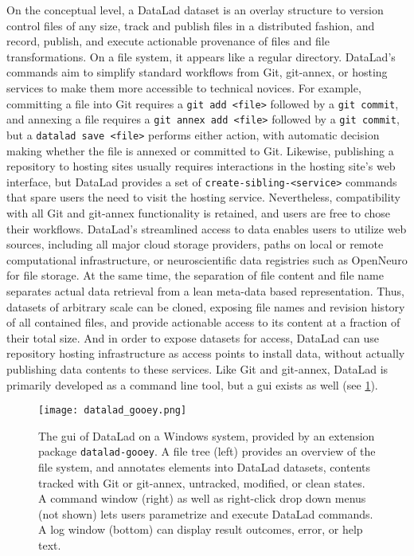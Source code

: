 {On the conceptual level, a DataLad dataset is an overlay structure to version control files of any size, track and publish files in a distributed fashion, and record, publish, and execute actionable provenance of files and file
transformations.
On a file system, it appears like a regular directory.
DataLad's commands aim to simplify standard workflows from Git, git-annex, or hosting services to make them more accessible to technical novices.
For example, committing a file into Git requires a \texttt{git add <file>} followed by a \texttt{git commit}, and annexing a file requires a \texttt{git annex add <file>} followed by a \texttt{git commit}, but a \texttt{datalad save <file>} performs either action, with automatic decision making whether the file is annexed or committed to Git.
Likewise, publishing a repository to hosting sites usually requires interactions in the hosting site's web interface, but DataLad provides a set of \texttt{create-sibling-<service>} commands that spare users the need to visit the hosting service.
Nevertheless, compatibility with all Git and git-annex functionality is retained, and users are free to chose their workflows.
DataLad's streamlined access to data enables users to utilize web sources, including all major cloud storage providers, paths on local or remote computational infrastructure, or neuroscientific data registries such as OpenNeuro \citep{markiewicz2021openneuro} for file storage.
At the same time, the separation of file content and file name separates actual data retrieval from a lean meta-data based representation.
Thus, datasets of arbitrary scale can be cloned, exposing file names and revision history of all contained files, and provide actionable access to its content at a fraction of their total size.
And in order to expose datasets for access, DataLad can use repository hosting infrastructure as access points to install data, without actually publishing data contents to these services.
Like Git and git-annex, DataLad is primarily developed as a command line tool, but a \gls{gui} exists as well (see \cref{fig:gooey}).

\begin{figure}
	\centering
	\texttt{[image: datalad\_gooey.png]}
	\caption[DataLad: Graphical User Interface]{The \gls{gui} of DataLad on a Windows system, provided by an extension package \texttt{datalad-gooey}. A file tree (left) provides an overview of the file system, and annotates elements into DataLad datasets, contents tracked with Git or git-annex, untracked, modified, or clean states. A command window (right) as well as right-click drop down menus (not shown) lets users parametrize and execute DataLad commands. A log window (bottom) can display result outcomes, error, or help text.}
	\label{fig:gooey}
\end{figure}


}
